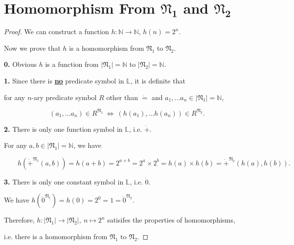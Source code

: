 \documentclass{article}
\begin{document}
\section{Homomorphism From $\boldsymbol{\mathfrak{N}_1}$ and $\boldsymbol{\mathfrak{N}_2}$}
\vspace{.5em}
\begin{proof}
    We can construct a function $h:\mathbb{N}\to\mathbb{N}$, $h(n)=2^n$.

    \hspace{1.3em}
    Now we prove that $h$ is a homomorphism from $\mathfrak{N}_1$ to $\mathfrak{N}_2$.

    \hspace{1.3em}
    \textbf{0.} Obvious $h$ is a function from $|\mathfrak{N}_1|=\mathbb{N}$ to $|\mathfrak{N}_2|=\mathbb{N}$.

    \hspace{1.3em}
    \textbf{1.} Since there is \underline{\textbf{no}} predicate symbol in $\mathbb{L}$, it is definite that 
    
    \hspace{5em}
    for any $n$-ary predicate symbol $R$ other than $\dot{=}$ and $a_1,...a_n\in|\mathfrak{N}_1|=\mathbb{N}$, 
    
    \vspace{-1.75em}
    $$(a_1,...a_n)\in R^{\mathfrak{N}_1}\ \Longleftrightarrow\ (h(a_1),...h(a_n))\in R^{\mathfrak{N}_2}.$$

    \vspace{-0.75em} \hspace{1.3em}
    \textbf{2.} There is only one function symbol in $\mathbb{L}$, i.e. $\dot{+}$.

    \hspace{2.7em}
    For any $a,b\in|\mathfrak{N}_1|=\mathbb{N}$, we have

    \vspace{-1.3em}
    $$\qquad h\left(\dot{+}^{\mathfrak{N}_1}(a,b)\right)=h(a+b)=2^{a+b}=2^a\times 2^b=h(a)\times h(b)=\dot{+}^{\mathfrak{N}_2}\left(h(a),h(b)\right).$$

    \vspace{-0.3em} \hspace{1.3em}
    \textbf{3.} There is only one constant symbol in $\mathbb{L}$, i.e. $\dot{0}$.

    \hspace{2.7em}
    We have $h\left(\dot{0}^{\mathfrak{N}_1}\right)=h(0)=2^0=1=\dot{0}^{\mathfrak{N}_2}$.

    \vspace{1.5em} \hspace{1.3em}
    Therefore, $h:|\mathfrak{N}_1|\to|\mathfrak{N}_2|,\ n\mapsto 2^n$ satisifes the properties of homomorphisms, 
    
    \hspace{1.3em}
    i.e. there is a homomorphism from $\mathfrak{N}_1$ to $\mathfrak{N}_2$.
\end{proof}
\end{document}
